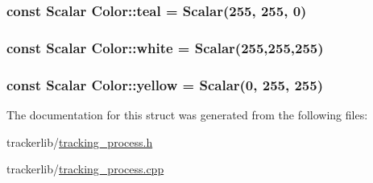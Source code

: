 \subsubsection[{\texorpdfstring{teal}{teal}}]{\setlength{\rightskip}{0pt plus 5cm}const Scalar Color\+::teal = Scalar(255, 255, 0)\hspace{0.3cm}{\ttfamily [static]}}\hypertarget{struct_color_aaf469a242ca8e42847a9886f90d498b6}{}\label{struct_color_aaf469a242ca8e42847a9886f90d498b6}
\subsubsection[{\texorpdfstring{white}{white}}]{\setlength{\rightskip}{0pt plus 5cm}const Scalar Color\+::white = Scalar(255,255,255)\hspace{0.3cm}{\ttfamily [static]}}\hypertarget{struct_color_acc387213feb8880e8fa61c306f6788ae}{}\label{struct_color_acc387213feb8880e8fa61c306f6788ae}
\subsubsection[{\texorpdfstring{yellow}{yellow}}]{\setlength{\rightskip}{0pt plus 5cm}const Scalar Color\+::yellow = Scalar(0, 255, 255)\hspace{0.3cm}{\ttfamily [static]}}\hypertarget{struct_color_a2280055de8d620e851a81f6e2603b5ad}{}\label{struct_color_a2280055de8d620e851a81f6e2603b5ad}


The documentation for this struct was generated from the following files\+:\begin{DoxyCompactItemize}
\item 
trackerlib/\hyperlink{tracking__process_8h}{tracking\+\_\+process.\+h}\item 
trackerlib/\hyperlink{tracking__process_8cpp}{tracking\+\_\+process.\+cpp}\end{DoxyCompactItemize}
